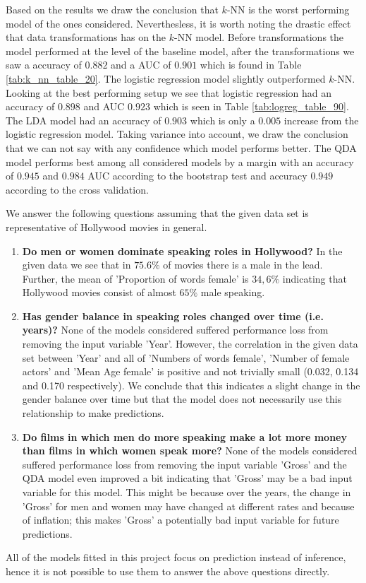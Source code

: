 \documentclass[../../project.tex]{subfiles}
\begin{document}
	Based on the results we draw the conclusion that $k$-NN is the worst performing model of the ones considered. Neverthesless, it is worth noting the drastic effect that data transformations has on the $k$-NN model. Before transformations the model performed at the level of the baseline model, after the transformations we saw a accuracy of $0.882$ and a AUC of $0.901$ which is found in Table \ref{tab:k_nn_table_20}. The logistic regression model slightly outperformed $k$-NN. Looking at the best performing setup we see that logistic regression had an accuracy of $0.898$ and AUC $0.923$ which is seen in Table \ref{tab:logreg_table_90}. The LDA model had an accuracy of $0.903$ which is only a $0.005$ increase from the logistic regression model. Taking variance into account, we draw the conclusion that we can not say with any confidence which model performs better. The QDA model performs best among all considered models by a margin with an accuracy of $0.945$ and $0.984$ AUC according to the bootstrap test and accuracy $0.949$ according to the cross validation.
	
	We answer the following questions assuming that the given data set is representative of Hollywood movies in general.
\begin{enumerate}
    \item \textbf{Do men or women dominate speaking roles in Hollywood?} In the given data we see that in $75.6\%$ of movies there is a male in the lead. Further, the mean of 'Proportion of words female' is $34,6\%$ indicating that Hollywood movies consist of almost $65\%$ male speaking.
    
    \item \textbf{Has gender balance in speaking roles changed over time (i.e. years)?} None of the models considered suffered performance loss from removing the input variable 'Year'. However, the correlation in the given data set between 'Year' and all of 'Numbers of words female', 'Number of female actors' and 'Mean Age female' is positive and not trivially small (0.032, 0.134 and 0.170 respectively). We conclude that this indicates a slight change in the gender balance over time but that the model does not necessarily use this relationship to make predictions.
   
    \item \textbf{Do films in which men do more speaking make a lot more money than films in which women speak more?} None of the models considered suffered performance loss from removing the input variable 'Gross' and the QDA model even improved a bit indicating that 'Gross' may be a bad input variable for this model. This might be because over the years, the change in 'Gross' for men and women may have changed at different rates and because of inflation; this makes 'Gross' a potentially bad input variable for future predictions.
\end{enumerate}
	
All of the models fitted in this project focus on prediction instead of inference, hence it is not possible to use them to answer the above questions directly.
	
	
\end{document}

